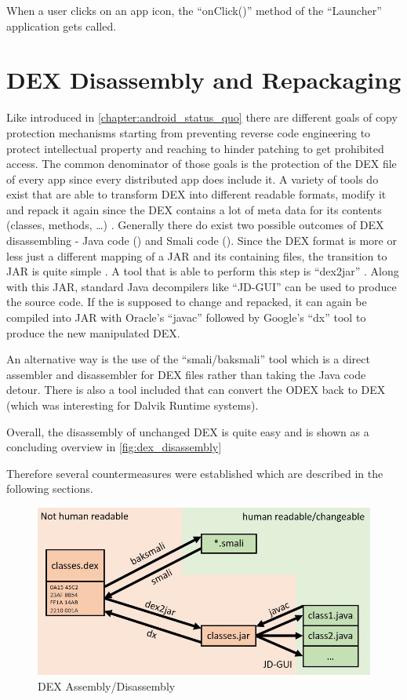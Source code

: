 When a user clicks on an app icon, the ``onClick()'' method
of the ``Launcher'' application gets called.


\section{DEX Disassembly and Repackaging}
Like introduced in \autoref{chapter:android_status_quo} there
are different goals of copy protection mechanisms starting from
preventing reverse code engineering to protect intellectual property
and reaching to hinder patching to get prohibited access.
The common denominator of those goals is the protection of
the DEX file of every app since every distributed app does include
it. A variety of tools do exist that
are able to transform DEX into different readable formats,
modify it and repack it again since the DEX contains
a lot of meta data for its contents (classes, methods, \ldots)
\parencite{dex}.
Generally there do exist two possible outcomes of DEX disassembling
- Java code () and Smali code ().
Since the DEX format is more or less just a different mapping of a
JAR and its containing  files, the transition to JAR
is quite simple \parencite{dvminternals}. A tool that is able to
perform this step is ``dex2jar'' \parencite{dex2jartool}.
Along with this JAR, standard Java decompilers like ``JD-GUI''
\parencite{jdtool} can be used to produce the  source code.
If the  is supposed to change and repacked, it can
again be compiled into JAR with Oracle's ``javac'' \parencite{javactool}
followed by Google's ``dx'' tool \parencite{dxtool}
to produce the new manipulated DEX.

An alternative way is the use of the ``smali/baksmali'' tool
\parencite{smalitool} which is a direct assembler and disassembler
for DEX files rather than taking the Java code detour. There is also
a tool included that can convert the ODEX back to DEX (which was interesting
for Dalvik Runtime systems).

Overall, the disassembly of unchanged DEX is quite easy and is shown
as a concluding overview in \autoref{fig:dex_disassembly}

Therefore several countermeasures were established which are
described in the following sections.

\begin{figure}[htb]
  \includegraphics[width=\textwidth]{figures/dex_disassembly}
  \caption[DEX Assembly/Disassembly]{DEX Assembly/Disassembly}
  \label{fig:dex_disassembly}
\end{figure}


